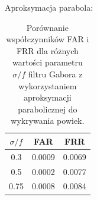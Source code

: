 Aproksymacja parabola:

\begin{table}[ht]
  \centering
  \begin{tabular}{c|c|c}
    \rowcolor{gray!20}
    $\sigma/f$ & FAR & FRR \\
    \hline\hline
    0.3 & 0.0009 & 0.0069 \\
    \hline
    0.5 & 0.0002 & 0.0077 \\
    \hline
    0.75 & 0.0008 & 0.0084 \\
  \end{tabular}
  \caption{Porównanie współczynników FAR i FRR dla różnych wartości parametru $\sigma/f$ filtru Gabora
  z wykorzystaniem aproksymacji parabolicznej do wykrywania powiek.}
\end{table}
